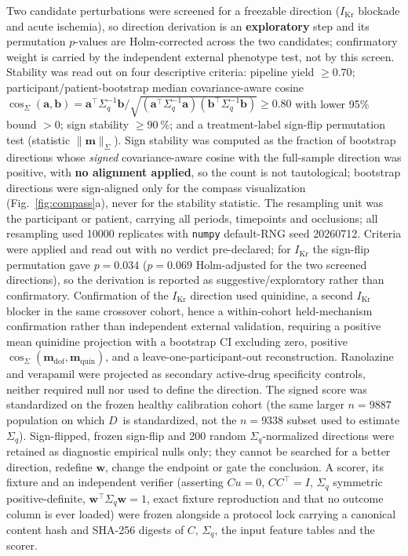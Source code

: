 \documentclass[11pt]{article}
\newcommand{\D}{\ensuremath{D}}
\begin{document}
Two candidate perturbations were screened for a freezable direction ($I_{\text{Kr}}$ blockade
and acute ischemia), so direction derivation is an \textbf{exploratory} step and its
permutation $p$-values are Holm-corrected across the two candidates; confirmatory weight is
carried by the independent external phenotype test, not by this screen. Stability was read out
on four descriptive criteria: pipeline yield $\ge\num{0.70}$; participant/patient-bootstrap
median covariance-aware cosine
$\cos_\Sigma(\mathbf{a},\mathbf{b})=\mathbf{a}^{\top}\Sigma_q^{-1}\mathbf{b}/\sqrt{(\mathbf{a}^{\top}\Sigma_q^{-1}\mathbf{a})(\mathbf{b}^{\top}\Sigma_q^{-1}\mathbf{b})}\ge\num{0.80}$
with lower 95\% bound $>0$; sign stability $\ge\SI{90}{\percent}$; and a treatment-label
sign-flip permutation test (statistic $\lVert\mathbf{m}\rVert_\Sigma$). Sign stability was
computed as the fraction of bootstrap directions whose \emph{signed} covariance-aware cosine
with the full-sample direction was positive, with \textbf{no alignment applied}, so the count
is not tautological; bootstrap directions were sign-aligned only for the compass visualization
(Fig.~\ref{fig:compass}a), never for the stability statistic. The resampling unit was the
participant or patient, carrying all periods, timepoints and occlusions; all resampling used
\num{10000} replicates with \texttt{numpy} default-RNG seed \num{20260712}. Criteria were
applied and read out with no verdict pre-declared; for $I_{\text{Kr}}$ the sign-flip
permutation gave $p=\num{0.034}$ ($p=\num{0.069}$ Holm-adjusted for the two screened
directions), so the derivation is reported as suggestive/exploratory rather than confirmatory. Confirmation of the $I_{\text{Kr}}$ direction used
quinidine, a second $I_{\text{Kr}}$ blocker in the same crossover cohort, hence a
within-cohort held-mechanism confirmation rather than independent external
validation, requiring a positive mean quinidine projection with a bootstrap CI excluding
zero, positive $\cos_\Sigma(\mathbf{m}_{\text{dof}},\mathbf{m}_{\text{quin}})$, and a
leave-one-participant-out reconstruction. Ranolazine and verapamil were projected as
secondary active-drug specificity controls, neither required null nor used to define the
direction. The signed score was standardized on the frozen healthy calibration cohort (the same
larger $n=\num{9887}$ population on which \D\ is standardized, not the $n=\num{9338}$ subset
used to estimate $\Sigma_q$). Sign-flipped, frozen sign-flip and \num{200}
random $\Sigma_q$-normalized directions were retained as diagnostic empirical nulls only;
they cannot be searched for a better direction, redefine $\mathbf{w}$, change the endpoint
or gate the conclusion. A scorer, its fixture and an independent verifier (asserting
$Cu=0$, $CC^{\top}=I$, $\Sigma_q$ symmetric positive-definite,
$\mathbf{w}^{\top}\Sigma_q\mathbf{w}=1$, exact fixture reproduction and that no outcome
column is ever loaded) were frozen alongside a protocol lock carrying a canonical content
hash and SHA-256 digests of $C$, $\Sigma_q$, the input feature tables and the scorer.
\end{document}
